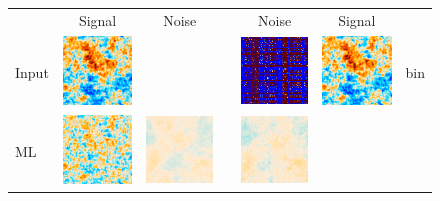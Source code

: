 \documentclass[twocolumn,apj]{aastex63}
\newenvironment{closetabcols}[1][0.5mm]{\setlength{\tabcolsep}{#1}}{}
\begin{document}
\begin{figure}[p]
	\centering
	\begin{closetabcols}
		\begin{tabular}{C{13mm}ccm{1mm}ccC{14mm}}
			& Signal & Noise & & Noise & Signal & \\
		Input &
		\includegraphics[width=30mm,valign=m]{subpix/toy2d_input_signal_map.png} &
		& &
		\includegraphics[width=30mm,valign=m]{subpix/toy2d_binned_nn_noise_map.png} &
		\includegraphics[width=30mm,valign=m]{subpix/toy2d_binned_nn_signal_map.png} &
		bin \\[13.6mm]
		ML &
		\includegraphics[width=30mm,valign=m]{subpix/toy2d_ml_nn_signal_map.png} &
		\includegraphics[width=30mm,valign=m]{subpix/toy2d_ml_nn_noise_map.png} & &
		\includegraphics[width=30mm,valign=m]{subpix/toy2d_destripe_plain_004_nn_noise_map.png} &

\end{tabular}
\end{closetabcols}
\end{figure}
\end{document}
